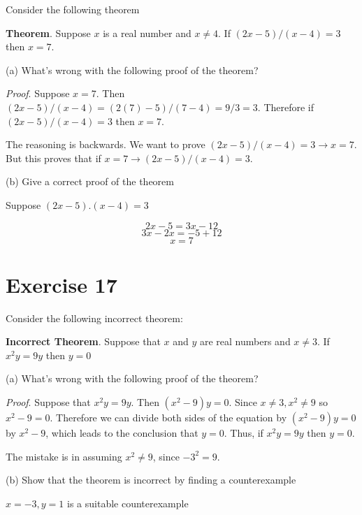 \documentclass[11pt]{article}
\newcommand{\then}{\rightarrow}
\begin{document}
Consider the following theorem

\textbf{Theorem}. Suppose $x$ is a real number and $x \neq 4$. If 
$(2x - 5)/(x - 4) = 3$ then $x = 7$.

\noindent (a) What's wrong with the following proof of the theorem?

\textit{Proof}. Suppose $x=7$. Then $(2x - 5)/(x-4) = (2(7) - 5)/(7-4)=9/3=3$.
Therefore if $(2x-5)/(x-4)=3$ then $x = 7$.

The reasoning is backwards. We want to prove $(2x - 5)/(x - 4) = 3 \then x = 7$.
But this proves that if $x = 7 \then (2x - 5)/(x - 4) = 3$.

\noindent (b) Give a correct proof of the theorem 

Suppose $(2x - 5).(x - 4) = 3$

$$2x - 5 = 3x - 12$$
$$3x - 2x = -5 + 12$$
$$x = 7$$

\section*{Exercise 17}

Consider the following incorrect theorem:

\textbf{Incorrect Theorem}. Suppose that $x$ and $y$ are real numbers and
$x \neq 3$. If $x^2 y = 9y$ then $y = 0$

\noindent (a) What's wrong with the following proof of the theorem?

\textit{Proof}. Suppose that $x^2 y = 9y$. Then $(x^2 - 9)y = 0$. Since 
$x \neq 3, x^2 \neq 9$ so $x^2 - 9 = 0$. Therefore we can divide both sides of 
the equation by $(x^2 - 9)y = 0$ by $x^2 - 9$, which leads to the conclusion 
that $y = 0$. Thus, if $x^2 y = 9y$ then $y = 0$.

The mistake is in assuming $x^2 \neq 9$, since $-3^2 = 9$.

\noindent (b) Show that the theorem is incorrect by finding a counterexample

$x = -3, y = 1$ is a suitable counterexample
\end{document}
